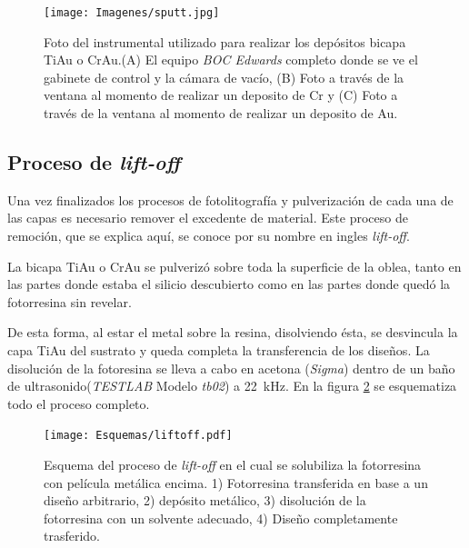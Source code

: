 		   		  \begin{figure}[b!]
				  \begin{center}
				  \texttt{[image: Imagenes/sputt.jpg]}
				  \caption[Equipo para depósito de películas delgadas, \textit{sputtering}]{Foto del instrumental utilizado para realizar los depósitos bicapa Ti\textbar Au o Cr\textbar Au.(A) El equipo \textit{BOC Edwards} completo donde se ve el gabinete de control y la cámara de vacío, (B) Foto a través de la ventana al momento de realizar un deposito de Cr y (C) Foto a través de la ventana al momento de realizar un deposito de Au.}
				  \label{fig:sputt}
				  \end{center}
				  \end{figure}

	\subsection{Proceso de\textit{ lift-off}}

   	     Una vez finalizados los procesos de fotolitografía y pulverización de cada una de las capas es necesario remover el excedente de material. Este proceso de remoción, que se explica aquí, se conoce por su nombre en ingles \textit{lift-off}.

		 La bicapa Ti\textbar Au o Cr\textbar Au se pulverizó sobre toda la superficie de la oblea, tanto en las partes donde estaba el silicio descubierto como en las partes donde quedó la fotorresina sin revelar. 
			
		 De esta forma, al estar el metal sobre la resina, disolviendo ésta, se desvincula la capa Ti\textbar Au del sustrato y queda completa la transferencia de los diseños. 
		 La disolución de la fotoresina se lleva a cabo en acetona (\textit{Sigma}) dentro de un baño de ultrasonido(\textit{TESTLAB} Modelo \textit{tb02}) a \SI{22}{\kHz}. En la figura \ref{esq:liftoff} se esquematiza todo el proceso completo.

		 \begin{figure}[h!]
			  \begin{center}
			  \texttt{[image: Esquemas/liftoff.pdf]}
			  \caption[Esquema del proceso de\textit{ lift-off}]{Esquema del proceso de\textit{ lift-off} en el cual se solubiliza la fotorresina con película metálica encima. 1) Fotorresina transferida en base a un diseño arbitrario, 2) depósito metálico, 3) disolución de la fotorresina con un solvente adecuado, 4) Diseño completamente trasferido.}
			  \label{esq:liftoff}
			  \end{center}
			  \end{figure}

